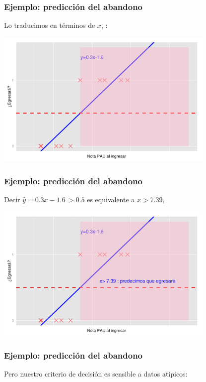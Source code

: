 \documentclass{beamer}
\begin{document}
 \begin{frame}\frametitle{Ejemplo: predicción del abandono}
   \begin{overlayarea}{\textwidth}{0.6cm}  
   Lo traducimos en términos de $x$, : 
 \end{overlayarea}
 \begin{center}
  \includegraphics[height=6.6cm]{egresara7.png}
\end{center}
 
 \end{frame}
 \begin{frame}\frametitle{Ejemplo: predicción del abandono}
   \begin{overlayarea}{\textwidth}{0.6cm}    
   Decir $\hat{y}= 0.3x-1.6\, >0.5$ es equivalente a $x>7.39$, 
 \end{overlayarea}
 \begin{center}
  \includegraphics[height=6.6cm]{egresara8.png}
\end{center}
  \end{frame}
 \begin{frame}\frametitle{Ejemplo: predicción del abandono}
   \begin{overlayarea}{\textwidth}{\textheight} 
   Pero nuestro criterio de decisión es sensible a datos atípicos:
   \end{overlayarea}
 \end{frame}
\end{document}
